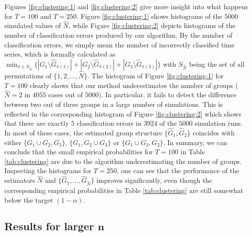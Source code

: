 \documentclass[12pt]{article}
\begin{document}
Figures \ref{fig:clustering:1} and \ref{fig:clustering:2} give more insight into what happens for $T=100$ and $T=250$. Figure \ref{fig:clustering:1} shows histograms of the $5000$ simulated values of $\widehat{N}$, while Figure \ref{fig:clustering:2} depicts histograms of the number of classification errors produced by our algorithm. By the number of classification errors, we simply mean the number of incorrectly classified time series, which is formally calculated as 
$\min_{\pi \in S_{\hat{N}}} \big\{ |G_1 \setminus \widehat{G}_{\pi(1)}| +|G_2 \setminus \widehat{G}_{\pi(2)}| + |G_3 \setminus \widehat{G}_{\pi(3)}| \big\}$
with $S_{\widehat{N}}$ being the set of all permutations of $\{1, 2, \ldots, \widehat{N}\}$. The histogram of Figure \ref{fig:clustering:1} for $T=100$ clearly shows that our method underestimates the number of groups ($\widehat{N} = 2$ in $4055$ cases out of $5000$). In particular, it fails to detect the difference between two out of three groups in a large number of simulations. This is reflected in the corresponding histogram of Figure \ref{fig:clustering:2} which shows that there are exactly $5$ classification errors in $3924$ of the $5000$ simulation runs. In most of these cases, the estimated group structure $\{ \widehat{G}_1, \widehat{G}_{2}\}$ coincides with either $\{ G_1 \cup G_2,G_3\}$,  $\{ G_1, G_2\cup G_3\}$ or $ \{ G_1 \cup G_3,G_2\}$. In summary, we can conclude that the small empirical probabilities for $T=100$ in Table \ref{tab:clustering} are due to the algorithm underestimating the number of groups. Inspecting the histograms for $T=250$, one can see that the performance of the estimators $\widehat{N}$ and $\{ \widehat{G}_1,\ldots, \widehat{G}_{\widehat{N}} \}$ improves significantly, even though the corresponding empirical probabilities in Table \ref{tab:clustering} are still somewhat below the target $(1-\alpha)$.  

\subsection{Results for larger $\boldsymbol{n}$}\label{subsec:sim:large_n}
\end{document}
